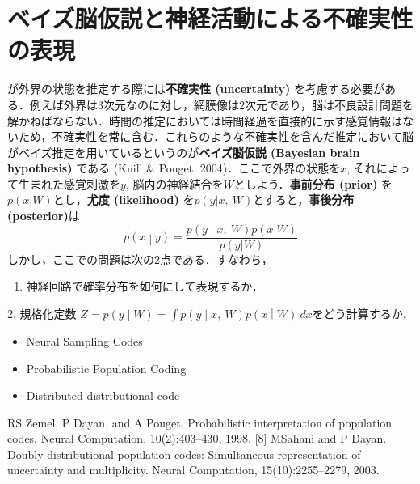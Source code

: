 \section{ベイズ脳仮説と神経活動による不確実性の表現}
が外界の状態を推定する際には\textbf{不確実性 (uncertainty)} を考慮する必要がある．例えば外界は3次元なのに対し，網膜像は2次元であり，脳は不良設計問題を解かねばならない．時間の推定においては時間経過を直接的に示す感覚情報はないため，不確実性を常に含む．これらのような不確実性を含んだ推定において脳がベイズ推定を用いているというのが\textbf{ベイズ脳仮説 (Bayesian brain hypothesis)} である (Knill & Pouget, 2004)．ここで外界の状態を$x$, それによって生まれた感覚刺激を$y$, 脳内の神経結合を$W$としよう．\textbf{事前分布 (prior)} を$p(x|W)$とし，\textbf{尤度 (likelihood)} を$p(y|x,\ W)$とすると，\textbf{事後分布 (posterior)}は
\begin{equation}
p\left( x \middle| y \right) = \frac{p\left( y \middle| x,\ W \right)p(x|W)}{p(y|W)}
\end{equation}
しかし，ここでの問題は次の2点である．すなわち，
\begin{enumerate}
\item  神経回路で確率分布を如何にして表現するか．
\end{enumerate}
2.  規格化定数 $Z = p\left( y \middle| W \right) = \int p\left( y \middle| x,\ W \right)p\left( x \middle| W \right)\ dx$をどう計算するか．
\begin{itemize}
\item Neural Sampling Codes
\item Probabilistic Population Coding
\item Distributed distributional code
\end{itemize}
RS Zemel, P Dayan, and A Pouget. Probabilistic interpretation of population codes. Neural Computation, 10(2):403–430, 1998. [8] MSahani and P Dayan. Doubly distributional population codes: Simultaneous representation of uncertainty and multiplicity. Neural Computation, 15(10):2255–2279, 2003.
